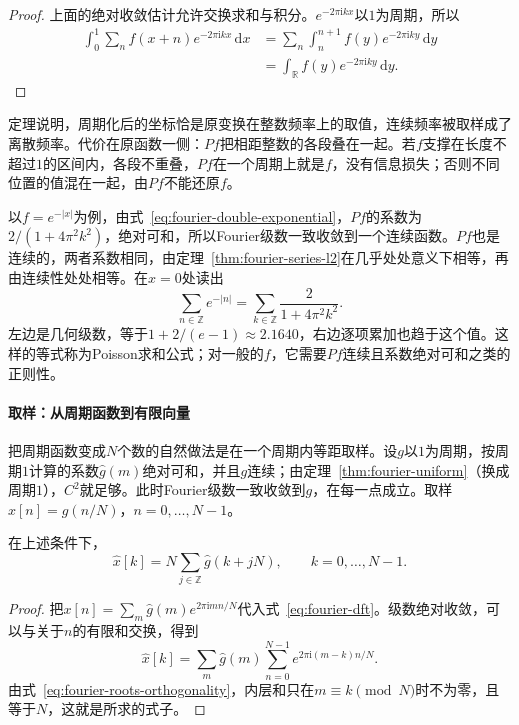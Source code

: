 \begin{proof}
上面的绝对收敛估计允许交换求和与积分。$e^{-2\pi\mathrm ikx}$以$1$为周期，所以
\[
\begin{aligned}
\int_0^1\sum_nf(x+n)e^{-2\pi\mathrm ikx}\,\mathrm dx&=\sum_n\int_n^{n+1}f(y)e^{-2\pi\mathrm iky}\,\mathrm dy\\
&=\int_{\mathbb R}f(y)e^{-2\pi\mathrm iky}\,\mathrm dy.
\end{aligned}
\]
\end{proof}

定理说明，周期化后的坐标恰是原变换在整数频率上的取值，连续频率被取样成了离散频率。代价在原函数一侧：$Pf$把相距整数的各段叠在一起。若$f$支撑在长度不超过$1$的区间内，各段不重叠，$Pf$在一个周期上就是$f$，没有信息损失；否则不同位置的值混在一起，由$Pf$不能还原$f$。

以$f=e^{-\lvert x\rvert}$为例，由式~\eqref{eq:fourier-double-exponential}，$Pf$的系数为$2/(1+4\pi^2k^2)$，绝对可和，所以Fourier级数一致收敛到一个连续函数。$Pf$也是连续的，两者系数相同，由定理~\ref{thm:fourier-series-l2}在几乎处处意义下相等，再由连续性处处相等。在$x=0$处读出
\[
\sum_{n\in\mathbb Z}e^{-\lvert n\rvert}=\sum_{k\in\mathbb Z}\frac{2}{1+4\pi^2k^2}.
\]
左边是几何级数，等于$1+2/(e-1)\approx2.1640$，右边逐项累加也趋于这个值。这样的等式称为Poisson求和公式；对一般的$f$，它需要$Pf$连续且系数绝对可和之类的正则性。

\paragraph{取样：从周期函数到有限向量}

把周期函数变成$N$个数的自然做法是在一个周期内等距取样。设$g$以$1$为周期，按周期$1$计算的系数$\widehat g(m)$绝对可和，并且$g$连续；由定理~\ref{thm:fourier-uniform}（换成周期$1$），$C^2$就足够。此时Fourier级数一致收敛到$g$，在每一点成立。取样$x[n]=g(n/N)$，$n=0,\ldots,N-1$。

\begin{theorem}[取样的离散变换]
\label{thm:fourier-sampling-aliasing}
在上述条件下，
\begin{equation}
\widehat x[k]=N\sum_{j\in\mathbb Z}\widehat g(k+jN),\qquad k=0,\ldots,N-1 .
\label{eq:fourier-aliasing}
\end{equation}
\end{theorem}

\begin{proof}
把$x[n]=\sum_m\widehat g(m)e^{2\pi\mathrm imn/N}$代入式~\eqref{eq:fourier-dft}。级数绝对收敛，可以与关于$n$的有限和交换，得到
\[
\widehat x[k]=\sum_m\widehat g(m)\sum_{n=0}^{N-1}e^{2\pi\mathrm i(m-k)n/N}.
\]
由式~\eqref{eq:fourier-roots-orthogonality}，内层和只在$m\equiv k\pmod N$时不为零，且等于$N$，这就是所求的式子。
\end{proof}

